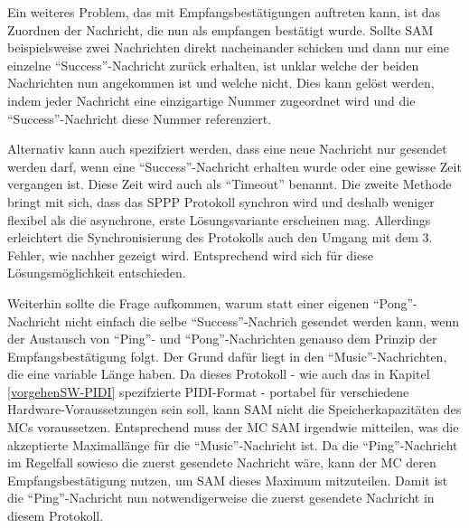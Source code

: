 Ein weiteres Problem, das mit Empfangsbestätigungen auftreten kann, ist das Zuordnen der Nachricht, die nun als empfangen bestätigt wurde. \newline
Sollte \ac{SAM} beispielsweise zwei Nachrichten direkt nacheinander schicken und dann nur eine einzelne \enquote{Success}-Nachricht zurück erhalten, ist unklar welche der beiden Nachrichten nun angekommen ist und welche nicht.
Dies kann gelöst werden, indem jeder Nachricht eine einzigartige Nummer zugeordnet wird und die \enquote{Success}-Nachricht diese Nummer referenziert.

Alternativ kann auch spezifziert werden, dass eine neue Nachricht nur gesendet werden darf, wenn eine \enquote{Success}-Nachricht erhalten wurde oder eine gewisse Zeit vergangen ist.
Diese Zeit wird auch als \enquote{Timeout} benannt. \newline
Die zweite Methode bringt mit sich, dass das \ac{SPPP} Protokoll synchron wird und deshalb weniger flexibel als die asynchrone, erste Lösungsvariante erscheinen mag.
Allerdings erleichtert die Synchronisierung des Protokolls auch den Umgang mit dem 3. Fehler, wie nachher gezeigt wird.
Entsprechend wird sich für diese Lösungsmöglichkeit entschieden.

Weiterhin sollte die Frage aufkommen, warum statt einer eigenen \enquote{Pong}-Nachricht nicht einfach die selbe \enquote{Success}-Nachrich gesendet werden kann, wenn der Austausch von \enquote{Ping}- und \enquote{Pong}-Nachrichten genauso dem Prinzip der Empfangsbestätigung folgt. \newline
Der Grund dafür liegt in den \enquote{Music}-Nachrichten, die eine variable Länge haben.
Da dieses Protokoll - wie auch das in Kapitel \ref{vorgehenSW-PIDI} spezifzierte \ac{PIDI}-Format - portabel für verschiedene Hardware-Voraussetzungen sein soll, kann \ac{SAM} nicht die Speicherkapazitäten des \ac{MC}s voraussetzen. \newline
Entsprechend muss der \ac{MC} \ac{SAM} irgendwie mitteilen, was die akzeptierte Maximallänge für die \enquote{Music}-Nachricht ist.
Da die \enquote{Ping}-Nachricht im Regelfall sowieso die zuerst gesendete Nachricht wäre, kann der \ac{MC} deren Empfangsbestätigung nutzen, um \ac{SAM} dieses Maximum mitzuteilen.
Damit ist die \enquote{Ping}-Nachricht nun notwendigerweise die zuerst gesendete Nachricht in diesem Protokoll.

